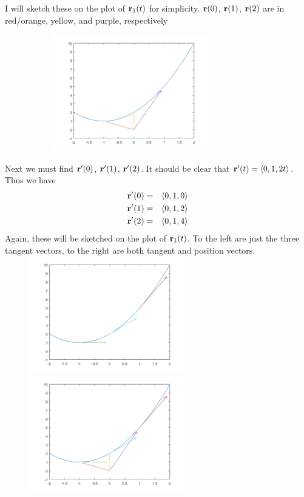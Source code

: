 \documentclass[12pt]{amsbook}
\newcommand{\la}{\langle}
\newcommand{\ra}{\rangle}
\begin{document}
I will sketch these on the plot of ${\bf r}_1(t)$ for simplicity. ${\bf r}(0)$, ${\bf r}(1)$, ${\bf r}(2)$ are in red/orange, yellow, and purple, respectively
\begin{center}
\begin{figure}
\includegraphics[width=3.5in,height=2.0in]{2_11_7_3.png}
\end{figure}
\end{center}
Next we must find ${\bf r}'(0)$, ${\bf r}'(1)$, ${\bf r}'(2)$. It should be clear that ${\bf r}'(t)=\la 0,1,2t \ra$. Thus we have
\begin{eqnarray*}
{\bf r}'(0)&=&\la 0,1,0 \ra\\
{\bf r}'(1)&=&\la 0,1,2 \ra\\
{\bf r}'(2)&=&\la 0,1,4 \ra
\end{eqnarray*}
Again, these will be sketched on the plot of ${\bf r}_1(t)$. To the left are just the three tangent vectors, to the right are both tangent and position vectors.
\\
\includegraphics[width=3.5in,height=2.0in]{2_11_7_4.png}
\includegraphics[width=3.5in,height=2.0in]{2_11_7_5.png}
\end{document}
